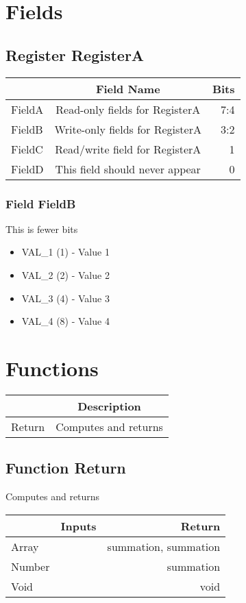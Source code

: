 \documentclass[a4paper,12pt,oneside,pdflatex,italian,final,twocolumn]{article}
\begin{document}
\raggedright

\section{Fields}



\raggedright

\subsection{Register RegisterA}
\centering
\begin{tabular}{lcr}
\toprule
  & Field Name & Bits \\
\midrule
FieldA & Read-only fields for RegisterA &
7:4
\\
FieldB & Write-only fields for RegisterA &
3:2
\\
FieldC & Read/write field for RegisterA &
1
\\
FieldD & This field should never appear &
0
\\
\bottomrule

\end{tabular}


\raggedright

\subsubsection{Field FieldB }

This is fewer bits

\begin{itemize}
\item VAL\_1 (1) - Value 1
\item VAL\_2 (2) - Value 2
\item VAL\_3 (4) - Value 3
\item VAL\_4 (8) - Value 4
\end{itemize}




\raggedright

\section{Functions}

\centering
\begin{tabular}{lc}
\toprule
  & Description \\
\midrule
Return & Computes and returns \\
\bottomrule
\end{tabular}


\raggedright
\subsection{Function Return }
Computes and returns \\

\centering
\begin{tabular}{lcr}
\toprule
  & Inputs & Return \\
\midrule
Array &
&
summation, 
summation
\\
Number &
&
summation
\\
Void &
&
void
\\
\bottomrule
\end{tabular}



\raggedright
\end{document}
